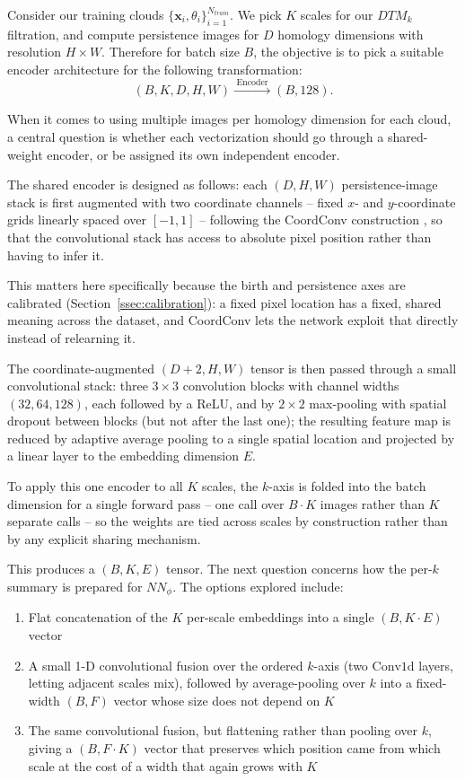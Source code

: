 \documentclass[11pt,letterpaper]{article}
\newcommand{\1}{\mathds{1}}
\newcommand{\pc}{\mathbf{x}}
\theoremstyle{plain}
\theoremstyle{definitioncolon}
\begin{document}
Consider our training clouds $\{\pc_i, \theta_i\}_{i=1}^{N_{train}}$. We pick $K$
scales for our $DTM_k$ filtration, and compute persistence images for $D$
homology dimensions with resolution $H \times W$. Therefore for batch size $B$,
the objective is to pick a suitable encoder architecture for the following
transformation:
    \begin{equation}
    (B, K, D, H, W) \xrightarrow{\;\text{Encoder}\;} (B, 128).
    \end{equation}

When it comes to using multiple images per homology dimension for each cloud, a
central question is whether each vectorization should go through a shared-weight
encoder, or be assigned its own independent encoder.

The shared encoder is designed as follows: each $(D, H, W)$ persistence-image
stack is first augmented with two coordinate channels -- fixed $x$- and
$y$-coordinate grids linearly spaced over $[-1, 1]$ -- following the CoordConv
construction \citep{liu2018coordconv}, so that the convolutional stack has access
to absolute pixel position rather than having to infer it.

This matters here specifically because the birth and persistence axes are
calibrated (Section~\ref{ssec:calibration}): a fixed pixel location has a fixed,
shared meaning across the dataset, and CoordConv lets the network exploit that
directly instead of relearning it.

The coordinate-augmented $(D+2, H, W)$ tensor is then passed through a small
convolutional stack: three $3\times3$ convolution blocks with channel widths
$(32, 64, 128)$, each followed by a ReLU, and by $2\times2$ max-pooling with
spatial dropout between blocks (but not after the last one); the resulting
feature map is reduced by adaptive average pooling to a single spatial location
and projected by a linear layer to the embedding dimension $E$.

To apply this one encoder to all $K$ scales, the $k$-axis is folded into the
batch dimension for a single forward pass -- one call over $B \cdot K$ images
rather than $K$ separate calls -- so the weights are tied across scales by
construction rather than by any explicit sharing mechanism.

This produces a $(B, K, E)$ tensor. The next question concerns how the per-$k$
summary is prepared for $NN_\phi$. The options explored include:
    \begin{enumerate}
        \item Flat concatenation of the $K$ per-scale embeddings into a single
        $(B, K \cdot E)$ vector
        \item A small 1-D convolutional fusion over the ordered $k$-axis (two
        $\text{Conv1d}$ layers, letting adjacent scales mix), followed by
        average-pooling over $k$ into a fixed-width $(B, F)$ vector whose size
        does not depend on $K$
        \item The same convolutional fusion, but flattening rather than pooling
        over $k$, giving a $(B, F \cdot K)$ vector that preserves which position
        came from which scale at the cost of a width that again grows with $K$
    \end{enumerate}
\end{document}
